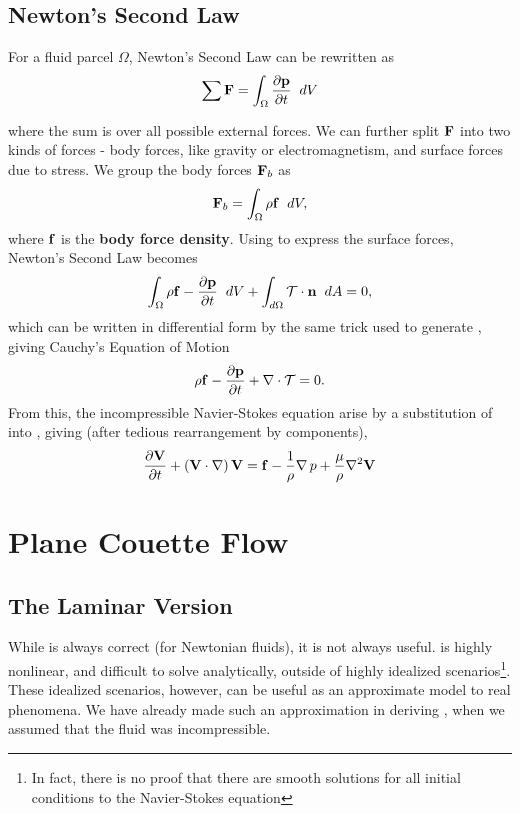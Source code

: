 \subsection{Newton's Second Law}
For a fluid parcel $\Omega$, Newton's Second Law can be rewritten as
\begin{equation}
\sum{}{}{\Vector{F}} = \int{\Omega}{}{
							\pder{1}{\Vector{p}}{t}}{dV}
\end{equation}
where the sum is over all possible external forces. We can further split $\mathbf{F}$ into two kinds of forces - body forces, like gravity or electromagnetism, and surface forces due to stress. We group the body forces $\mathbf{F}_b$ as \begin{equation}
\Vector{F}_b = \int{\Omega}{}{\rho\Vector{f}}{dV},
\end{equation}
where $\mathbf{f}$ is the {\bf body force density}. Using  to express the surface forces, Newton's Second Law becomes
\begin{equation}
\int{\Omega}{}{\rho{\Vector{f}-\pder{1}{\Vector{p}}{t}}}{dV} + \int{d\Omega}{}{\Tensor{T}\cdot\Vector{n}}{dA} = 0,
\end{equation}
which can be written in differential form by the same trick used to generate , giving Cauchy's Equation of Motion
\begin{equation}\label{eq:CauchyEOM}
\rho{\Vector{f}-\pder{1}{\Vector{p}}{t} } + \Div{\Tensor{T}} = 0.
\end{equation}
From this, the incompressible Navier-Stokes equation arise by a substitution of  into , giving (after tedious rearrangement by components),
\begin{equation}\label{eq:NS}
\pder{1}{\Vector{V}}{t} + \paren{\Vector{V}\cdot\nabla}\Vector{V} = \Vector{f} - \frac{1}{\rho}\Grad{p} + \frac{\mu}{\rho}\nabla^2\Vector{V}
\end{equation}

\section{Plane Couette Flow}
\subsection{The Laminar Version}
While  is always correct (for Newtonian fluids), it is not always useful.  is highly nonlinear, and difficult to solve analytically, outside of highly idealized scenarios\footnote{In fact, there is no proof that there are smooth solutions for all initial conditions to the Navier-Stokes equation}. These idealized scenarios, however, can be useful as an approximate model to real phenomena. We have already made such an approximation in deriving , when we assumed that the fluid was incompressible. \\

